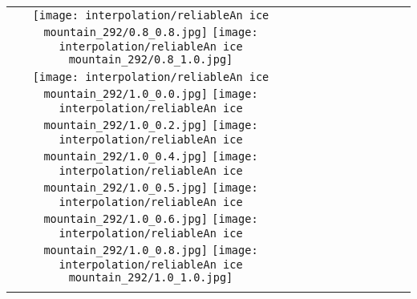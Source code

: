 \documentclass[10pt,twocolumn,letterpaper]{article}
\begin{document}
\begin{figure*}[tb!]
{\begin{tabular}{c c c c c c c c c c}
  \texttt{[image: interpolation/reliableAn ice mountain\_292/0.8\_0.8.jpg]}
  \texttt{[image: interpolation/reliableAn ice mountain\_292/0.8\_1.0.jpg]}
\tabularnewline
    \raisebox{0.1in}{\rotatebox{90}{\small \emph{}
 }}
  \texttt{[image: interpolation/reliableAn ice mountain\_292/1.0\_0.0.jpg]}
  \texttt{[image: interpolation/reliableAn ice mountain\_292/1.0\_0.2.jpg]}
   \texttt{[image: interpolation/reliableAn ice mountain\_292/1.0\_0.4.jpg]}
  \texttt{[image: interpolation/reliableAn ice mountain\_292/1.0\_0.5.jpg]}
  \texttt{[image: interpolation/reliableAn ice mountain\_292/1.0\_0.6.jpg]}
  \texttt{[image: interpolation/reliableAn ice mountain\_292/1.0\_0.8.jpg]}
  \texttt{[image: interpolation/reliableAn ice mountain\_292/1.0\_1.0.jpg]}
    \tabularnewline
        \raisebox{0.1in}{\rotatebox{90}{
 }}
 \hspace{0.5mm}


\end{tabular}}
\end{figure*}
\end{document}
